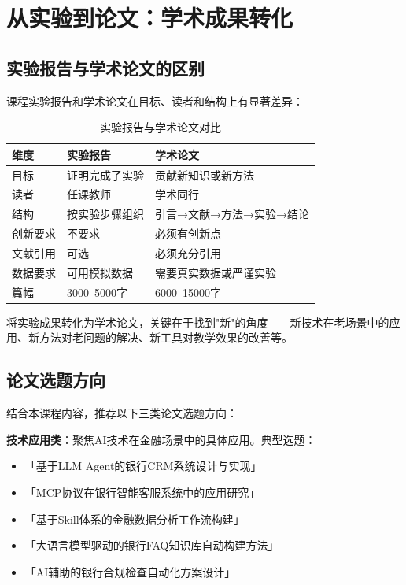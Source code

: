 \section{从实验到论文：学术成果转化}

\subsection{实验报告与学术论文的区别}

课程实验报告和学术论文在目标、读者和结构上有显著差异：

\begin{table}[H]
\centering
\begin{tabular}{lll}
\toprule
\textbf{维度} & \textbf{实验报告} & \textbf{学术论文} \\
\midrule
目标 & 证明完成了实验 & 贡献新知识或新方法 \\
读者 & 任课教师 & 学术同行 \\
结构 & 按实验步骤组织 & 引言→文献→方法→实验→结论 \\
创新要求 & 不要求 & 必须有创新点 \\
文献引用 & 可选 & 必须充分引用 \\
数据要求 & 可用模拟数据 & 需要真实数据或严谨实验 \\
篇幅 & 3000--5000字 & 6000--15000字 \\
\bottomrule
\end{tabular}
\caption{实验报告与学术论文对比}
\end{table}

将实验成果转化为学术论文，关键在于找到"新"的角度——新技术在老场景中的应用、新方法对老问题的解决、新工具对教学效果的改善等。

\subsection{论文选题方向}

结合本课程内容，推荐以下三类论文选题方向：

\textbf{技术应用类}：聚焦AI技术在金融场景中的具体应用。典型选题：

\begin{itemize}[leftmargin=2em]
  \item 「基于LLM Agent的银行CRM系统设计与实现」
  \item 「MCP协议在银行智能客服系统中的应用研究」
  \item 「基于Skill体系的金融数据分析工作流构建」
  \item 「大语言模型驱动的银行FAQ知识库自动构建方法」
  \item 「AI辅助的银行合规检查自动化方案设计」
\end{itemize}

